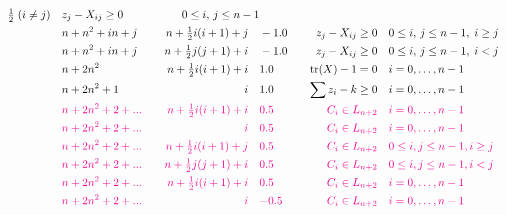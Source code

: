 \documentclass[11pt,a4paper]{article}
\DeclareMathOperator{\tr}{tr}
\theoremstyle{definition}
\begin{document}
{\[\begin{aligned}
{      \tfrac{1}{2}\; (i\neq j)} \quad & z_j - X_{ij} \geq 0 \quad & 0
    \leq i,\, j \leq n-1 \\
    & n+n^2+in+j \quad & n+\tfrac{1}{2}i(i+1)+j \quad & -1.0 \quad & z_j -
    X_{ij} \geq 0 \quad &
    0 \leq i,\, j \leq n-1,\; i \geq j \\
    & n+n^2+in+j \quad & n+\tfrac{1}{2}j(j+1)+i \quad & -1.0 \quad & z_j -
    X_{ij} \geq 0 \quad &
    0 \leq i,\, j \leq n-1,\; i < j \\
    & n+2n^2 \quad & n+\tfrac{1}{2}i(i+1)+i \quad & 1.0 \quad & \tr(X) -
    1 = 0 \quad & i = 0,\dots,n-1 \\
    & n+2n^2+1 \quad & i \quad & 1.0 \quad & \sum z_i - k \geq 0 \quad &
    i = 0,\dots,n-1 \\
    & {\color{magenta} n+2n^2+2+...} \quad &
    {\color{magenta}n+\tfrac{1}{2}i(i+1)+i} \quad & {\color{magenta}0.5}
    \quad & {\color{magenta}C_i \in L_{n+2}} \quad & {\color{magenta}i =
      0,\dots,n-1} \\
    & {\color{magenta}n+2n^2+2+...} \quad & {\color{magenta} i} \quad &
    {\color{magenta} 0.5} \quad & {\color{magenta} C_i \in L_{n+2}} \quad &
    {\color{magenta} i = 0,\dots,n-1} \\
    & {\color{magenta} n+2n^2+2+...}  \quad & {\color{magenta}
      n+\tfrac{1}{2}i(i+1)+j} \quad & {\color{magenta} 0.5} \quad  &
    {\color{magenta} C_i \in L_{n+2}} \quad & {\color{magenta} 0 \leq
      i,j\leq n-1, i \geq j} \\
    & {\color{magenta} n+2n^2+2+...}  \quad & {\color{magenta}
      n+\tfrac{1}{2}j(j+1)+i} \quad & {\color{magenta} 0.5} \quad  &
    {\color{magenta} C_i \in L_{n+2}} \quad & {\color{magenta} 0 \leq
      i,j\leq n-1, i < j} \\
    & {\color{magenta} n+2n^2+2+...}  \quad & {\color{magenta}
      n+\tfrac{1}{2}i(i+1)+i} \quad & {\color{magenta} 0.5} \quad  &
    {\color{magenta} C_i \in L_{n+2}} \quad & {\color{magenta} i =
      0,\dots,n-1} \\
    & {\color{magenta} n+2n^2+2+...}  \quad & {\color{magenta} i} \quad &
    {\color{magenta} -0.5} \quad  & {\color{magenta} C_i \in L_{n+2}} \quad
    & {\color{magenta} i = 0,\dots,n-1} \\
  \end{aligned}
\]

}
\end{document}

